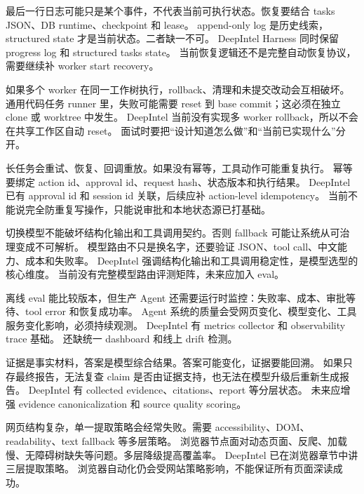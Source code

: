 {最后一行日志可能只是某个事件，不代表当前可执行状态。恢复要结合 tasks JSON、DB runtime、checkpoint 和 lease。}
{append-only log 是历史线索，structured state 才是当前状态。二者缺一不可。}
{DeepIntel Harness 同时保留 progress log 和 structured tasks state。}
{当前恢复逻辑还不是完整自动恢复协议，需要继续补 worker start recovery。}

{如果多个 worker 在同一工作树执行，rollback、清理和未提交改动会互相破坏。}
{通用代码任务 runner 里，失败可能需要 reset 到 base commit；这必须在独立 clone 或 worktree 中发生。}
{DeepIntel 当前没有实现多 worker rollback，所以不会在共享工作区自动 reset。}
{面试时要把“设计知道怎么做”和“当前已实现什么”分开。}

{长任务会重试、恢复、回调重放。如果没有幂等，工具动作可能重复执行。}
{幂等要绑定 action id、approval id、request hash、状态版本和执行结果。}
{DeepIntel 已有 approval id 和 session id 关联，后续应补 action-level idempotency。}
{当前不能说完全防重复写操作，只能说审批和本地状态源已打基础。}

{切换模型不能破坏结构化输出和工具调用契约。否则 fallback 可能让系统从可治理变成不可解析。}
{模型路由不只是换名字，还要验证 JSON、tool call、中文能力、成本和失败率。}
{DeepIntel 强调结构化输出和工具调用稳定性，是模型选型的核心维度。}
{当前没有完整模型路由评测矩阵，未来应加入 eval。}

{离线 eval 能比较版本，但生产 Agent 还需要运行时监控：失败率、成本、审批等待、tool error 和恢复成功率。}
{Agent 系统的质量会受网页变化、模型变化、工具服务变化影响，必须持续观测。}
{DeepIntel 有 metrics collector 和 observability trace 基础。}
{还缺统一 dashboard 和线上 drift 检测。}

{证据是事实材料，答案是模型综合结果。答案可能变化，证据要能回溯。}
{如果只存最终报告，无法复查 claim 是否由证据支持，也无法在模型升级后重新生成报告。}
{DeepIntel 有 collected evidence、citations、report 等分层状态。}
{未来应增强 evidence canonicalization 和 source quality scoring。}

{网页结构复杂，单一提取策略会经常失败。需要 accessibility、DOM、readability、text fallback 等多层策略。}
{浏览器节点面对动态页面、反爬、加载慢、无障碍树缺失等问题。多层降级提高覆盖率。}
{DeepIntel 已在浏览器章节中讲三层提取策略。}
{浏览器自动化仍会受网站策略影响，不能保证所有页面深读成功。}

